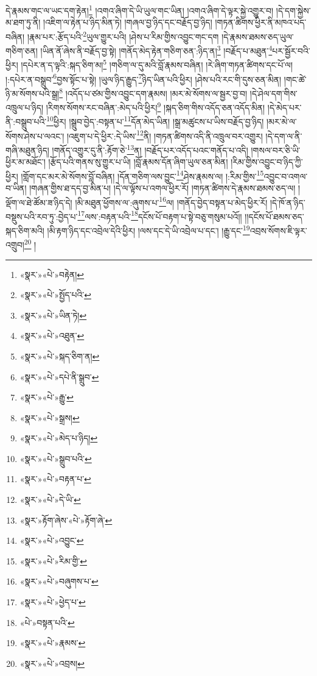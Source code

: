 དེ་རྣམས་གང་ལ་ཡང་དག་རྟེན།\footnote{«སྣར་»«པེ་»བརྟེན།} །འགའ་ཞིག་དེ་ཡི་ཡུལ་གང་ཡིན། །འགའ་ཞིག་དེ་ལྟར་སྐྱེ་འགྱུར་བ། །དེ་དག་སྐྱེས་མ་ཐག་ཏུ་ནི། །འཇིག་ལ་རྟེན་པ་ཉིད་མིན་ཏེ། །གཞལ་བྱ་ཉིད་དང་བརྗོད་བྱ་ཉིད། །གཏན་ཚིགས་ཕྱིར་ནི་མཁའ་པད་བཞིན། །རྣམ་པར་:རྩོད་པའི་\footnote{«སྣར་»«པེ་»སྤྱོད་པའི་}ཡུལ་གྱུར་པའི། །ཤེས་པ་རིམ་གྱིས་འབྱུང་གང་དག །དེ་རྣམས་ཐམས་ཅད་ཡུལ་གཅིག་ཅན། །ཡིན་ནོ་ཞེས་ནི་བརྗོད་བྱ་སྟེ། །གནོད་མེད་རྟེན་གཅིག་ཅན་:ཉིད་ན།\footnote{«སྣར་»«པེ་»ཡིན་ཏེ།} །བརྗོད་པ་མཐུན་\footnote{«སྣར་»«པེ་»འཐུན་}པར་སྦྱོར་བའི་ཕྱིར། །དཔེར་ན་ད་ལྟའི་:སྐད་ཅིག་མ།\footnote{«སྣར་»«པེ་»སྐད་ཅིག་ན།} །གཅིག་ལ་དུ་མའི་བློ་རྣམས་བཞིན། །རེ་ཞིག་གཏན་ཚིགས་དང་པོ་ལ། །:དཔེར་ན་བསྒྲུབ་\footnote{«སྣར་»«པེ་»དཔེ་ནི་སྒྲུབ་}བྱས་སྟོང་པ་སྟེ། །ཡུལ་ཉིད་རྒྱུད་\footnote{«སྣར་»«པེ་»རྒྱུ་}ཉིད་ཡིན་པའི་ཕྱིར། །ཤེས་པའི་རང་གི་དུས་ཅན་མིན། །གང་ཚེ་ཉི་མ་སོགས་པའི་སྒྲ།\footnote{«སྣར་»«པེ་»སྒྲས།} །འདོད་པ་ཙམ་གྱིས་འབྱུང་དག་རྣམས། །མར་མེ་སོགས་ལ་སྦྱར་བྱ་བ། །དེ་ཤེལ་དག་གིས་འཁྲུལ་པ་ཉིད། །རིགས་སོགས་རང་བཞིན་:མེད་པའི་ཕྱིར།\footnote{«སྣར་»«པེ་»མེད་པ་ཉིད།} །སྐད་ཅིག་གིས་འདོད་ཅན་འདོད་མིན། །དེ་མེད་པར་ནི་:བསྒྲུབ་པའི་\footnote{«སྣར་»«པེ་»སྒྲུབ་པའི་}ཕྱིར། །སྒྲུབ་བྱེད་:བསྟན་པ་\footnote{«སྣར་»«པེ་»བརྟན་པ་}དོན་མེད་ཡིན། །སྒྲ་མཚུངས་པ་ཡིས་བརྗོད་བྱ་ཉིད། །མར་མེ་ལ་སོགས་ཤེས་པ་ལའང་། །འཇུག་པ་དེ་ཕྱིར་:དེ་ཡིས་\footnote{«སྣར་»«པེ་»དེ་ཡི་}ནི། །གཏན་ཚིགས་འདི་ནི་འཁྲུལ་བར་འགྱུར། །དེ་དག་ལ་ནི་གཞི་མཐུན་ཉིད། །གནོད་འགྱུར་དུ་ནི་:རྟོག་ཅེ་\footnote{«སྣར་»རྟོག་ཞེས་«པེ་»རྟོག་ཞེ་}ན། །བརྗོད་པར་འདོད་པའང་གནོད་པ་འདི། །གསལ་བར་ཅི་ཡི་ཕྱིར་མ་མཐོང་། །རྩོད་པའི་གནས་སུ་གྱུར་པ་ཡི། །བློ་རྣམས་དོན་ཞིག་ཡུལ་ཅན་མིན། །རིམ་གྱིས་འབྱུང་བ་ཉིད་ཀྱི་ཕྱིར། །གློག་དང་མར་མེ་སོགས་བློ་བཞིན། །དོན་གཅིག་ལས་བྱུང་\footnote{«སྣར་»«པེ་»འབྱུང་}ཤེས་རྣམས་ལ། །:རིམ་གྱིས་\footnote{«སྣར་»«པེ་»རིམ་གྱི་}འབྱུང་བ་འགལ་བ་ཡིན། །གཞན་གྱིས་ཐ་དད་བྱ་མིན་པ། །དེ་ལ་ལྟོས་པ་འགལ་ཕྱིར་རོ། །གཏན་ཚིགས་དེ་རྣམས་ཐམས་ཅད་ལ། །ལྡོག་ལ་ཐེ་ཚོམ་ཟ་ཉིད་དེ། །མི་མཐུན་ཕྱོགས་ལ་:ཞུགས་པ་\footnote{«སྣར་»«པེ་»བཞུགས་པ་}ལ། །གནོད་བྱེད་བསྟན་པ་མེད་ཕྱིར་རོ། །དེ་ཁོ་ན་ཉིད་བསྡུས་པའི་རབ་ཏུ་:བྱེད་པ་\footnote{«སྣར་»«པེ་»ཕྱེད་པ་}ལས་:བརྟན་པའི་\footnote{«པེ་»བསྟན་པའི་}དངོས་པོ་བརྟག་པ་སྟེ་བཅུ་གསུམ་པའོ།། །།དངོས་པོ་ཐམས་ཅད་སྐད་ཅིག་མའི། །མི་རྟག་ཉིད་དང་འབྲེལ་དེའི་ཕྱིར། །ལས་དང་དེ་ཡི་འབྲེལ་པ་དང་། །རྒྱུ་དང་\footnote{«སྣར་»«པེ་»རྣམས་}འབྲས་སོགས་ཇི་ལྟར་འགྲུབ།\footnote{«སྣར་»«པེ་»འབྲས།} །

